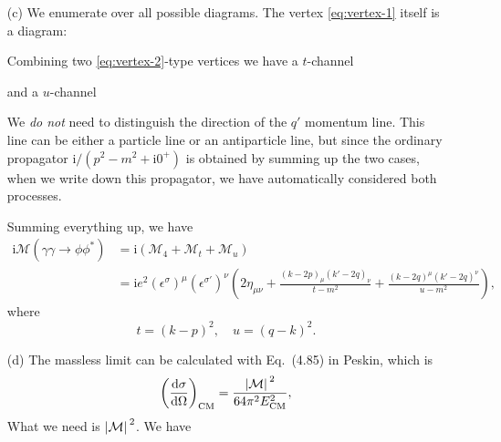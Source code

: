 \documentclass[hyperref, a4paper]{article}
\newcommand*{\ii}{\mathrm{i}}
\begin{document}
\begin{itemize}
\item[(c)] We enumerate over all possible diagrams. The vertex \eqref{eq:vertex-1} itself is a diagram:
 
Combining two \eqref{eq:vertex-2}-type vertices we have a $t$-channel

and a $u$-channel


\begin{note*}{}{}
    We \emph{do not} need to distinguish the direction of the $q'$ momentum line. This line can be either 
    a particle line or an antiparticle line, but since the ordinary propagator $\ii / (p^2 - m^2 + \ii 0^+)$ 
    is obtained by summing up the two cases, when we write down this propagator, we have automatically 
    considered both processes. 
\end{note*}

Summing everything up, we have 
\begin{equation}
    \begin{aligned}
        \ii \mathcal{M}(\gamma \gamma \to \phi \phi^*) &= \ii (\mathcal{M}_4 + \mathcal{M}_t + \mathcal{M}_u) \\
        &= \ii e^2 (\epsilon^\sigma)^\mu (\epsilon^{\sigma'})^\nu \left( 2 \eta_{\mu \nu} + \frac{(k-2p)_\mu (k'-2q)_\nu}{t - m^2} + \frac{(k-2q)^\mu (k'-2q)^\nu}{u - m^2} \right),
    \end{aligned}
\end{equation}
where 
\begin{equation}
    t = (k-p)^2, \quad u = (q-k)^2.
\end{equation}

\item[(d)] The massless limit can be calculated with Eq.~(4.85) in Peskin, which is 
\begin{equation}
    \left(\dv{\sigma}{\Omega}\right)_\text{CM} = \frac{\abs*{\mathcal{M}}^2}{64 \pi^2 E_\text{CM}^2},
\end{equation} 
What we need is $\abs*{\mathcal{M}}^2$. We have 


\end{itemize}
\end{document}
